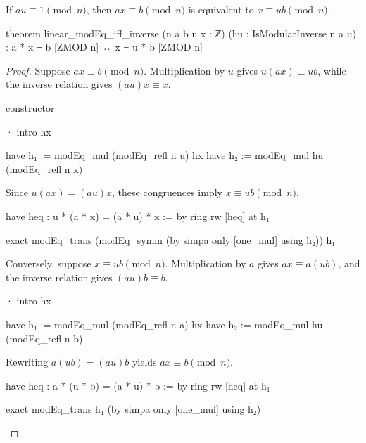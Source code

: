 \begin{theorem}
  \label{ent:thm:linear-modeq-iff-inverse}
  If $au\equiv1\pmod n$, then $ax\equiv b\pmod n$ is equivalent to $x\equiv ub\pmod n$.

  \begin{lean}
    theorem linear_modEq_iff_inverse (n a b u x : ℤ) (hu : IsModularInverse n a u) :
        a * x ≡ b [ZMOD n] ↔ x ≡ u * b [ZMOD n]
  \end{lean}
\end{theorem}

\begin{proof}
  Suppose $ax\equiv b\pmod n$.
  Multiplication by $u$ gives $u(ax)\equiv ub$, while the inverse relation gives $(au)x\equiv x$.

  \begin{lean}
    constructor

    · intro hx

      have h₁ := modEq_mul (modEq_refl n u) hx
      have h₂ := modEq_mul hu (modEq_refl n x)
  \end{lean}

  Since $u(ax)=(au)x$, these congruences imply $x\equiv ub\pmod n$.

  \begin{lean}
    have heq : u * (a * x) = (a * u) * x := by
      ring
    rw [heq] at h₁

    exact modEq_trans (modEq_symm (by simpa only [one_mul] using h₂)) h₁
  \end{lean}

  Conversely, suppose $x\equiv ub\pmod n$.
  Multiplication by $a$ gives $ax\equiv a(ub)$, and the inverse relation gives $(au)b\equiv b$.

  \begin{lean}
    · intro hx

      have h₁ := modEq_mul (modEq_refl n a) hx
      have h₂ := modEq_mul hu (modEq_refl n b)
  \end{lean}

  Rewriting $a(ub)=(au)b$ yields $ax\equiv b\pmod n$.

  \begin{lean}
    have heq : a * (u * b) = (a * u) * b := by
      ring
    rw [heq] at h₁

    exact modEq_trans h₁ (by simpa only [one_mul] using h₂)
  \end{lean}
\end{proof}

